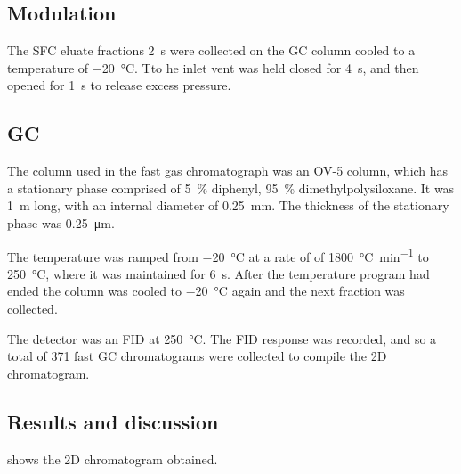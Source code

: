 \subsection{Modulation}

The SFC eluate fractions \SI{2}{\second} were collected on the GC column
cooled to a temperature of \SI{-20}{\celsius}. Tto he inlet vent was held closed
for \SI{4}{\second}, and then opened for \SI{1}{\second} to release excess
pressure.

\subsection{GC}

The column used in the fast gas chromatograph was an OV-5 column, which has a
stationary phase comprised of \SI{5}{\percent} diphenyl, \SI{95}{\percent}
dimethylpolysiloxane. It was \SI{1}{\metre} long, with an internal diameter of
\SI{0.25}{\milli\metre}. The thickness of the stationary phase was
\SI{0.25}{\micro\metre}.

The temperature was ramped from \SI{-20}{\celsius} at a rate of of
\SI{1800}{\celsius\per\minute} to \SI{250}{\celsius}, where it was maintained
for \SI{6}{s}. After the temperature program had ended the column was cooled to
\SI{-20}{\celsius} again and the next fraction was collected.

The detector was an FID at \SI{250}{\celsius}. The FID response was recorded,
and so a total of 371 fast GC chromatograms were collected to compile the 2D
chromatogram.

\subsection{Results and discussion}

 shows the 2D chromatogram obtained. 

